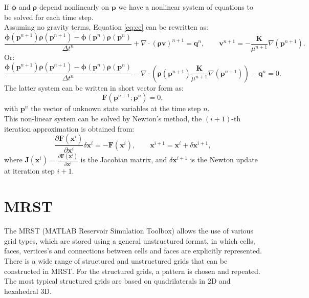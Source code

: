 \documentclass[12pt]{report}
\begin{document}
If $\mathbf{\phi}$ and $\mathbf{\rho}$ depend nonlinearly on $\mathbf{p}$ we have a nonlinear system 
of equations to be solved for each time step.  \\
Assuming no gravity terms, Equation \eqref{eq:ce}
can be rewritten as:
\begin{equation}\label{eq:ce3}
 \frac{\mathbf{\phi}(\mathbf{p}^{n+1})\mathbf{\rho}(\mathbf{p}^{n+1})
 -\mathbf{\phi}(\mathbf{p}^{n})\mathbf{\rho}(\mathbf{p}^{n})}{\Delta t^n}
 +\nabla \cdot (\mathbf{\rho} \mathbf{v})^{n+1}=\mathbf{q}^{n},
\qquad
\mathbf{v}^{n+1}= -\frac{\mathbf{K}}{\mu^{n+1}}\nabla(\mathbf{p}^{n+1}).
\end{equation}
Or:
\begin{equation}\label{eq:ce4}
 \frac{\mathbf{\phi}(\mathbf{p}^{n+1})\mathbf{\rho}(\mathbf{p}^{n+1})
 -\mathbf{\phi}(\mathbf{p}^{n})\mathbf{\rho}(\mathbf{p}^{n})}{\Delta t^n}
 -\nabla \cdot (\mathbf{\rho}(\mathbf{p}^{n+1}) 
 \frac{\mathbf{K}}{\mu^{n+1}}\nabla(\mathbf{p}^{n+1}))-\mathbf{q}^{n}=0.
\end{equation}
The latter system can be written in short vector form as:
\begin{equation}\label{NR}
 \mathbf{F}(\mathbf{p}^{n+1};\mathbf{p}^n)=0,
\end{equation}
with $\mathbf{p}^n$ the vector of unknown state variables at the time step $n$.\\
This non-linear system can be solved by Newton's method, the $(i+1)$-th iteration approximation is obtained from:
$$\frac{\partial \mathbf{F}(\mathbf{x}^i)}{\partial \mathbf{x}^i}\delta\mathbf{x}^i=-\mathbf{F}(\mathbf{x}^i),
\qquad \mathbf{x}^{i+1}=\mathbf{x}^i+\delta \mathbf{x}^{i+1},$$
where $\mathbf{J}(\mathbf{x}^i)=\frac{\partial \mathbf{F}(\mathbf{x}^i)}{\partial \mathbf{x}^i}$ is the 
Jacobian matrix, and $\delta \mathbf{x}^{i+1}$ is the Newton update at iteration step $i+1$.\\
\section*{MRST}
The MRST (MATLAB Reservoir Simulation Toolbox) allows the use of various grid types, which are stored using a general unstructured
format, in which cells, faces, vertices's and connections between cells and faces are explicitly
represented. \\
There is a wide range of structured and unstructured grids that can be constructed in MRST.
For the structured grids, a pattern is chosen and repeated. The most typical structured grids are 
based on quadrilaterals in 2D and hexahedral 3D.
\end{document}
